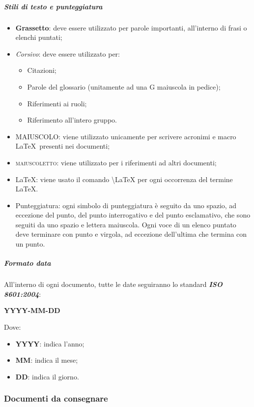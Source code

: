 				\subparagraph{Stili di testo e punteggiatura}
				\begin{itemize}
					\item \textbf{Grassetto}: deve essere utilizzato per parole importanti, all’interno di frasi o elenchi puntati;
					\item \textit{Corsivo}: deve essere utilizzato per:
					\begin{itemize}
						\item Citazioni;
						\item Parole del glossario (unitamente ad una G maiuscola in pedice);
						\item Riferimenti ai ruoli;
						\item Riferimento all’intero gruppo.
					\end{itemize}
					\item MAIUSCOLO: viene utilizzato unicamente per scrivere acronimi e macro \LaTeX\ presenti nei documenti;
					\item \textsc{maiuscoletto}: viene utilizzato per i riferimenti ad altri documenti;
					\item \LaTeX: viene usato il comando \textbackslash{LaTeX} per ogni occorrenza del termine \LaTeX.
					\item Punteggiatura: ogni simbolo di punteggiatura è seguito da uno spazio, ad eccezione del punto, del punto interrogativo e del punto esclamativo, che sono seguiti da uno spazio e lettera maiuscola. Ogni voce di un elenco puntato deve terminare con punto e virgola, ad eccezione dell’ultima che termina con un punto. 
					\end{itemize}
	
				\subparagraph{Formato data}
				All’interno di ogni documento, tutte le date seguiranno lo standard \textit{\textbf{ISO 8601:2004}}:
				\begin{center}
					\textbf{YYYY-MM-DD}
				\end{center}
				Dove:
				\begin{itemize}
					\item \textbf{YYYY}: indica l’anno;
					\item \textbf{MM}: indica il mese;
					\item \textbf{DD}: indica il giorno.
				\end{itemize}
		
		\subsubsection{Documenti da consegnare}
